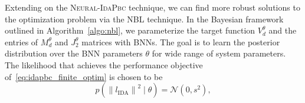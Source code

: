 Extending on the \textsc{Neural-IdaPbc} technique, we can find more robust
solutions to the optimization problem via the NBL technique. In the Bayesian
framework outlined in Algorithm~\ref{algo:nbl}, we parameterize the target
function $V_d^\theta$ and the entries of $M_d^\theta$ and $J_2^\theta$ matrices
with BNNs. 
%
The goal is to learn the posterior distribution over the BNN parameters $\theta$
for wide range of system parameters.
%
The likelihood that achieves the performance objective
of~\eqref{eq:idapbc_finite_optim} is chosen to be
%
\begin{equation}
    p(\left\| l_{\textrm{IDA}} \right\|^2 \mid \theta) = \mathcal{N}\left(0, s^2 \right),
    \label{eqn:likelihood_idapbc}
\end{equation}
%
